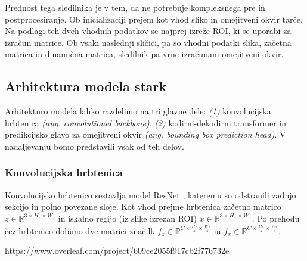 \documentclass[a4paper,12pt,openright]{book}
\begin{document}
Prednost tega sledilnika je v tem, da ne potrebuje kompleksnega pre in postprocesiranje. Ob inicializaciji prejem kot vhod sliko in omejitveni okvir tarče. Na podlagi teh dveh vhodnih podatkov se najprej izreže ROI, ki se uporabi za izračun matrice. Ob vsaki naslednji sličici, pa so vhodni podatki slika, začetna matrica in dinamična matrica, sledilnik pa vrne izračunani omejitveni okvir.

\subsection{Arhitektura modela stark}
Arhitekturo modela lahko razdelimo na tri glavne dele: \emph{(1)} konvolucijska hrbtenica \emph{(ang. convolutional backbone)}, \emph{(2)} kodirni-dekodirni transformer in predikcijsko glavo za omejitveni okvir \emph{(ang. bounding box prediction head)}. V nadaljevanju bomo predstavili vsak od teh delov.

\subsubsection{Konvolucijska hrbtenica}
Konvolucijsko hrbtenico sestavlja model ResNet \cite{resnet}, kateremu so odstranili zadnjo sekcijo in polno povezane sloje. Kot vhod prejme hrbtenica začetno matrico $ z \in \mathbb{R}^{3 \times H_z \times W_z} $ in iskalno regijo (iz slike izrezan ROI) $ x \in \mathbb{R}^{3 \times H_x \times W_x} $. Po prehodu čez hrbtenico dobimo dve matrici značilk
$ f_z \in \mathbb{R}^{C \times \frac{H_z}{s} \times \frac{W_z}{s}} $ in $ f_x \in \mathbb{R}^{C \times \frac{H_x}{s} \times \frac{W_x}{s}} $.




\printbibliography[heading=bibintoc,type=article,title={Članki v revijah}]
https://www.overleaf.com/project/609ce2055f917cb2f776732e
\printbibliography[heading=bibintoc,type=inproceedings,title={Članki v zbornikih}]

\printbibliography[heading=bibintoc,type=incollection,title={Poglavja v knjigah}]

\printbibliography[heading=bibintoc,title={Celotna literatura}]
\end{document}

